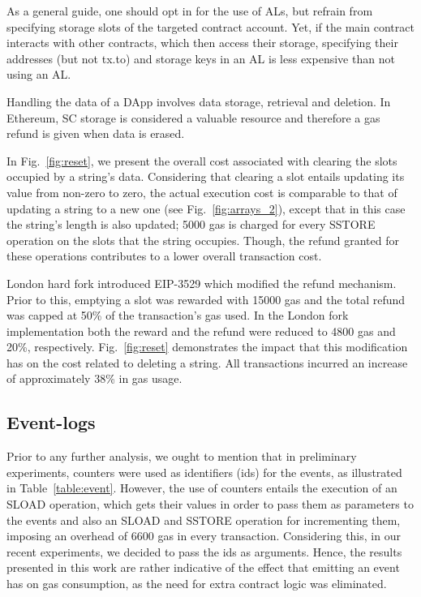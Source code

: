 As a general guide, one should opt in for the use of ALs, but refrain from specifying storage slots of the targeted contract account. Yet, if the main contract interacts with other contracts, which then access their storage, specifying their addresses (but not tx.to) and storage keys in an AL is less expensive than not using an AL.

Handling the data of a DApp involves data storage, retrieval and deletion. In Ethereum, SC storage is considered a valuable resource and therefore a gas refund is given when data is erased.

In Fig.~\ref{fig:reset}, we present the overall cost associated with clearing the slots occupied by a string’s data. Considering that clearing a slot entails updating its value from non-zero to zero, the actual execution cost is comparable to that of updating a string to a new one (see Fig.~\ref{fig:arrays_2}), except that in this case the string's length is also updated; 5000 gas is charged for every SSTORE operation on the slots that the string occupies. Though, the refund granted for these operations contributes to a lower overall transaction cost.

London hard fork introduced EIP-3529  \citep{buterin_eip_3529} which modified the refund mechanism. Prior to this, emptying a slot was rewarded with 15000 gas and the total refund was capped at 50\% of the transaction’s gas used. In the London fork implementation both the reward and the refund were reduced to 4800 gas and 20\%, respectively. Fig.~\ref{fig:reset} demonstrates the impact that this modification has on the cost related to deleting a string. All transactions incurred an increase of approximately 38\% in gas usage.

\subsection{Event-logs}\label{subsection:}

Prior to any further analysis, we ought to mention that in preliminary experiments, counters were used as identifiers (ids) for the events, as illustrated in Table~\ref{table:event}. However, the use of counters entails the execution of an SLOAD operation, which gets their values in order to pass them as parameters to the events and also an SLOAD and SSTORE operation for incrementing them, imposing an overhead of 6600 gas in every transaction. Considering this, in our recent experiments, we decided to pass the ids as arguments. Hence, the results presented in this work are rather indicative of the effect that emitting an event has on gas consumption, as the need for extra contract logic was eliminated.

